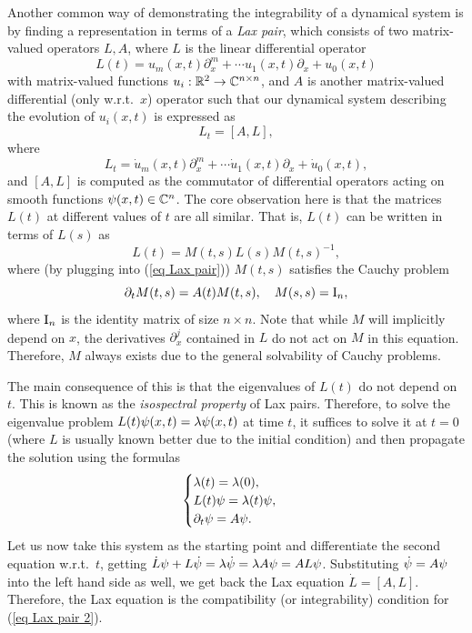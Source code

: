 \begin{example}\label{ex Lax pairs}
    Another common way of demonstrating the integrability of a dynamical system is by finding a representation in terms of a \emph{Lax pair}, which consists of two matrix-valued operators $L,A$, where $L$ is the linear differential operator
    \[L(t)=u_m(x,t)\partial_x^m+\cdots u_1(x,t)\partial_x+u_0(x,t)\]
    with matrix-valued functions $u_i:\bbR^2\to \bbC^{n\times n}$, and $A$ is another matrix-valued differential (only w.r.t.\ $x$) operator such that our dynamical system describing the evolution of $u_i(x,t)$ is expressed as 
    \[L_t=[A,L],\label{eq Lax pair}\]
    where 
    \[L_t=\dot u_m(x,t)\partial_x^m+\cdots \dot u_1(x,t)\partial_x+\dot u_0(x,t),\]
    and $[A,L]$ is computed as the commutator of differential operators acting on smooth functions $\bf{\psi}(x,t)\in\bbC^n$. The core observation here is that the matrices $L(t)$ at different values of $t$ are all similar. That is, $L(t)$ can be written in terms of $L(s)$ as 
    \[L(t)=M(t,s)L(s)M(t,s)^{-1},\]
    where (by plugging into (\ref{eq Lax pair})) $M(t,s)$ satisfies the Cauchy problem 
    \[\partial_t M(t,s)=A(t)M(t,s),\quad M(s,s)=\rmI_n,\]
    where $\rmI_n$ is the identity matrix of size $n\times n$.
    Note that while $M$ will implicitly depend on $x$, the derivatives $\partial_x^j$ contained in $L$ do not act on $M$ in this equation. Therefore, $M$ always exists due to the general solvability of Cauchy problems.

    The main consequence of this is that the eigenvalues of $L(t)$ do not depend on $t$. This is known as the \emph{isospectral property} of Lax pairs. Therefore, to solve the eigenvalue problem $L(t)\bf{\psi}(x,t)=\lambda\bf{\psi}(x,t)$ at time $t$, it suffices to solve it at $t=0$ (where $L$ is usually known better due to the initial condition) and then propagate the solution using the formulas
    \[\begin{cases}
        \lambda(t)=\lambda(0),\\
        L(t)\bf{\psi}=\lambda(t)\bf{\psi},\\
        \partial_t\bf{\psi}=A\bf{\psi}.
    \end{cases}\label{eq Lax pair 2}\]
    Let us now take this system as the starting point and differentiate the second equation w.r.t.\ $t$, getting $\dot L\bf{\psi}+L\dot{\bf{\psi}}=\lambda\dot{\bf{\psi}}=\lambda A\bf{\psi}=A L\bf{\psi}$. Substituting $\dot{\bf{\psi}}=A\bf{\psi}$ into the left hand side as well, we get back the Lax equation $\dot L=[A,L]$. Therefore, the Lax equation is the compatibility (or integrability) condition for (\ref{eq Lax pair 2}).


\end{example}
